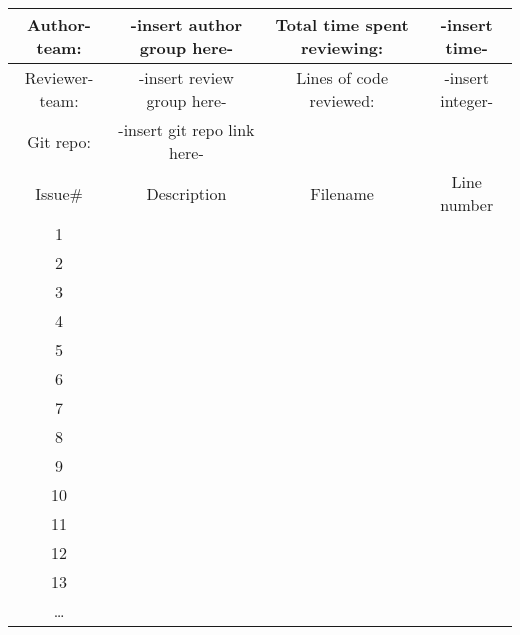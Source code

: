 \begin{table}[H]
\begin{tabular}{|c|c|c|c|}
\hline
Author-team: & -insert author group here- & Total time spent reviewing: &
-insert time- \\ \hline
Reviewer-team: & -insert review group here- & Lines of code reviewed:& -insert
integer-\\ \hline
Git repo: & -insert git repo link here- && \\ \hline
Issue\# & Description & Filename & Line number\\ \hline
1 &&& \\ \hline
2 &&& \\ \hline
3 &&& \\ \hline
4 &&& \\ \hline
5 &&& \\ \hline
6 &&& \\ \hline
7&&& \\ \hline
8&&& \\ \hline
9&&& \\ \hline
10&&& \\ \hline
11&&& \\ \hline
12&&& \\ \hline
13&&& \\ \hline
\ldots &&& \\ \hline
\end{tabular}
\end{table}
